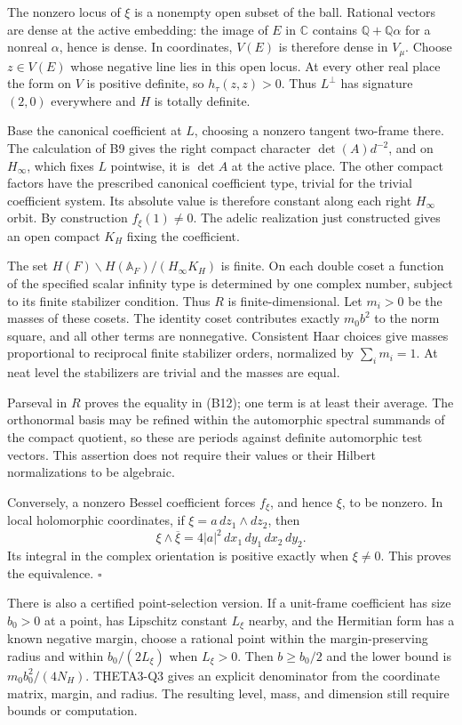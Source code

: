 \documentclass[11pt]{article}
\newcommand{\Q}{\mathbb Q}\newcommand{\C}{\mathbb C}\newcommand{\Z}{\mathbb Z}\newcommand{\R}{\mathbb R}\newcommand{\A}{\mathbb A}\newcommand{\OO}{\mathcal O}
\theoremstyle{definition}\newtheorem{definition}[theorem]{Definition}\newtheorem{remark}[theorem]{Remark}
\begin{document}
The nonzero locus of $\xi$ is a nonempty open subset of the ball. Rational vectors are dense at the active embedding: the image of $E$ in $\C$ contains $\Q+\Q\alpha$ for a nonreal $\alpha$, hence is dense. In coordinates, $V(E)$ is therefore dense in $V_\mu$. Choose $z\in V(E)$ whose negative line lies in this open locus. At every other real place the form on $V$ is positive definite, so $h_\tau(z,z)>0$. Thus $L^\perp$ has signature $(2,0)$ everywhere and $H$ is totally definite.

Base the canonical coefficient at $L$, choosing a nonzero tangent two-frame there. The calculation of B9 gives the right compact character $\det(A)d^{-2}$, and on $H_\infty$, which fixes $L$ pointwise, it is $\det A$ at the active place. The other compact factors have the prescribed canonical coefficient type, trivial for the trivial coefficient system. Its absolute value is therefore constant along each right $H_\infty$ orbit. By construction $f_\xi(1)\ne0$. The adelic realization just constructed gives an open compact $K_H$ fixing the coefficient.

The set $H(F)\backslash H(\A_F)/(H_\infty K_H)$ is finite. On each double coset a function of the specified scalar infinity type is determined by one complex number, subject to its finite stabilizer condition. Thus $R$ is finite-dimensional. Let $m_i>0$ be the masses of these cosets. The identity coset contributes exactly $m_0b^2$ to the norm square, and all other terms are nonnegative. Consistent Haar choices give masses proportional to reciprocal finite stabilizer orders, normalized by $\sum_i m_i=1$. At neat level the stabilizers are trivial and the masses are equal.

Parseval in $R$ proves the equality in (B12); one term is at least their average. The orthonormal basis may be refined within the automorphic spectral summands of the compact quotient, so these are periods against definite automorphic test vectors. This assertion does not require their values or their Hilbert normalizations to be algebraic.

Conversely, a nonzero Bessel coefficient forces $f_\xi$, and hence $\xi$, to be nonzero. In local holomorphic coordinates, if $\xi=a\,dz_1\wedge dz_2$, then
\[
 \xi\wedge\overline\xi
   =4|a|^2\,dx_1\,dy_1\,dx_2\,dy_2.
\]
Its integral in the complex orientation is positive exactly when $\xi\ne0$. This proves the equivalence. \hfill$\square$

There is also a certified point-selection version. If a unit-frame coefficient has size $b_0>0$ at a point, has Lipschitz constant $L_\xi$ nearby, and the Hermitian form has a known negative margin, choose a rational point within the margin-preserving radius and within $b_0/(2L_\xi)$ when $L_\xi>0$. Then $b\geq b_0/2$ and the lower bound is $m_0b_0^2/(4N_H)$. THETA3-Q3 gives an explicit denominator from the coordinate matrix, margin, and radius. The resulting level, mass, and dimension still require bounds or computation.
\end{document}
